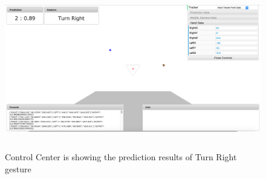 \begin{figure}
	[h] \centering 
	\includegraphics[height=70mm]{figures/result/cc-turn-right.png} \caption{Control Center is showing the prediction results of Turn Right gesture} 
	\label{res:cc:turn:right}	
\end{figure}